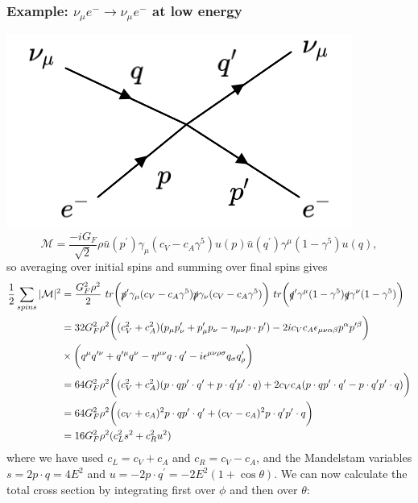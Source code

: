 \documentclass[a4paper,12pt]{article}
\begin{document}
\subsubsection{Example: $\nu_\mu e^- \to \nu_\mu e^-$ at low energy}
%
  \includegraphics[width=0.4\linewidth]{figs/24b.png}
\newline
\begin{equation}
\mathcal{M} = \frac{-iG_F}{\sqrt{2}} \rho \bar{u}(p^\prime) \gamma_\mu(c_V - c_A \gamma^5) u(p) \bar{u}(q^\prime) \gamma^\mu (1-\gamma^5) u(q),
\end{equation}
so averaging over initial spins and summing over final spins gives
\begin{equation}
\begin{split}
\frac{1}{2}\sum_{spins}|\mathcal{M}|^2 &= \frac{G_F^2\rho^2}{2}\ tr \bigg(\slashed{p}^\prime \gamma_\mu(c_V-c_A\gamma^5)\slashed{p}\gamma_\nu(c_V-c_A \gamma^5)\bigg)\ tr \bigg(\slashed{q}^\prime \gamma^\mu(1-\gamma^5)\slashed{q}\gamma^\nu(1-\gamma^5)\bigg) \\
&= 32G_F^2 \rho^2 \bigg( (c_V^2+c_A^2)(p_\mu p^\prime_\nu + p^\prime_\mu p_\nu - \eta_{\mu \nu} p\cdot p^\prime) - 2ic_Vc_A \epsilon_{\mu \nu \alpha \beta}p^\alpha p^{\prime \beta}\bigg) \\
&\times \bigg(q^\mu q^{\prime \nu} + q^{\prime \mu} q^\nu -\eta^{\mu \nu} q \cdot q^\prime - i\epsilon^{\mu \nu \rho \sigma}q_\sigma q^\prime_\rho \bigg) \\
&= 64G_F^2 \rho^2 \bigg( (c_V^2+c_A^2)(p \cdot q p^\prime \cdot q^\prime + p\cdot q^\prime p^\prime \cdot q) + 2c_Vc_A(p \cdot q p^\prime \cdot q^\prime - p\cdot q^\prime p^\prime \cdot q) \bigg) \\
&= 64G_F^2 \rho^2 \bigg((c_V+c_A)^2 p \cdot q p^\prime \cdot q^\prime + (c_V-c_A)^2 p \cdot q^\prime p^\prime \cdot q \bigg) \\
&= 16 G_F^2\rho^2(c_L^2s^2 + c_R^2u^2)
\end{split}
\end{equation}
where we have used $c_L = c_V + c_A$ and $c_R = c_V-c_A$, and the Mandelstam variables $s=2 p \cdot q = 4E^2$ and $u=-2p \cdot q^\prime = -2E^2(1+ \cos\theta)$. We can now calculate the total cross section by integrating first over $\phi$ and then over $\theta$:
\end{document}
